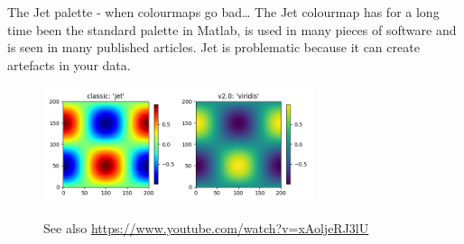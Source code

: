 \documentclass[9pt, aspectratio=169]{beamer}
\begin{document}
\begin{frame}
    {The Jet palette - when colourmaps go bad\dots}
    The Jet colourmap has for a long time been the standard palette in Matlab, is used in many pieces of software and is seen in many published articles. Jet is problematic because it can create artefacts in your data.

    \begin{figure}
        \centering
        \includegraphics[width=300px]{jet_vs_viridis.png}

        \caption{\centering
            \color{gray}{Jet can create artefacts in the data. [Source: Matplotlib website]}
        }

        See also \url{https://www.youtube.com/watch?v=xAoljeRJ3lU}
    \end{figure}
\end{frame}
\end{document}
